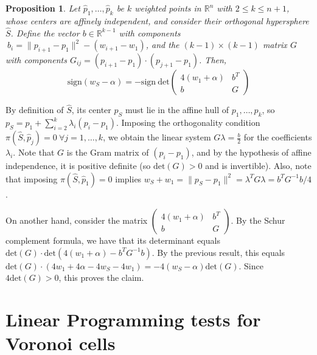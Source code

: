 \documentclass[12pt]{article}
\makeatletter
\newtheorem{proposition}[theorem]{Proposition}
\theoremstyle{definition}
\theoremstyle{remark}
\renewenvironment{proof}[1][\proofname]{\par
  \pushQED{\qed}%
  \normalfont \footnotesize \topsep6\p@\@plus6\p@\relax
  \list{}{\leftmargin=2em
          \settowidth{\itemindent}{\itshape#1}%
          \labelwidth=\itemindent
          \parsep=0pt \listparindent=\parindent 
  }
  \item[\hskip\labelsep
        \itshape
    #1\@addpunct{.}]\ignorespaces
}{%
  \popQED\endlist\@endpefalse
}
\makeatother
\begin{document}
\begin{proposition}\label{prop:ws_radius}
    Let $\hat p_1, \ldots, \hat p_k$ be $k$ weighted points in $\mathbb{R}^n$ with $2 \leq k \leq n+1$, whose centers are affinely independent, and consider their orthogonal hypersphere $\hat S$. Define the vector $b \in \mathbb{R}^{k-1}$ with components $\ b_i=\|p_{i+1} - p_1\|^2 - (w_{i+1} -w_1)$, and the $(k-1)\times (k-1)$ matrix $G$ with components $G_{ij} = (p_{i+1} - p_1) \cdot (p_{j+1} - p_1)$. Then, 
    \begin{equation*}
        \mathrm{sign}(w_S - \alpha) = - \mathrm{sign} \ \mathrm{det} \begin{pmatrix}
                4 (w_1 + \alpha) & b^T \\ b & G
            \end{pmatrix} 
    \end{equation*} 
\end{proposition}
\begin{proof}
    By definition of $\hat S$, its center $p_S$ must lie in the affine hull of $p_1, \ldots, p_k$, so $p_S = p_1 + \sum_{i=2}^k \lambda_i(p_i - p_1)$. Imposing the orthogonality condition $\pi(\hat S, \hat p_j) =0 \ \forall j=1,\ldots, k$, we obtain the linear system $G \lambda = \frac{b}{2}$ for the coefficients $\lambda_i$. Note that $G$ is the Gram matrix of $(p_i - p_1)$, and by the hypothesis of affine independence, it is positive definite (so $\mathrm{det}(G) > 0$ and is invertible). Also, note that imposing $\pi(\hat S, \hat p_1) = 0$ implies $w_S + w_1 = \| p_S - p_1\|^2 = \lambda ^T G \lambda = {b^T G^{-1} b}/{4}$.

On another hand, consider the matrix $\begin{pmatrix}
                4 (w_1 + \alpha) & b^T \\ b & G
                \end{pmatrix}$.
By the Schur complement formula, we have that its determinant equals $\mathrm{det}(G) \cdot \mathrm{det}(4 (w_1+\alpha) - b^T G^{-1}b)$. By the previous result, this equals $\mathrm{det}(G) \cdot (4 w_1 + 4 \alpha - 4 w_S - 4 w_1) = - 4 (w_S - \alpha) \mathrm{det}(G)$. Since $4\mathrm{det}(G) > 0$, this proves the claim.
\end{proof}



\newpage
\section{Linear Programming tests for Voronoi cells}\label{appendix:LP}
\end{document}
